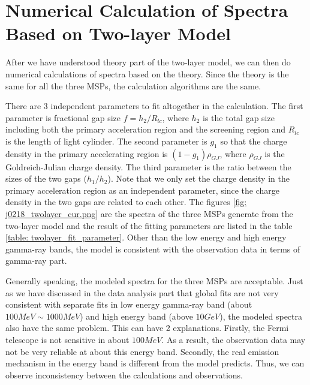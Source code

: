 \documentclass[12pt]{report}
\begin{document}
        \section{Numerical Calculation of Spectra Based on Two-layer Model}
          After we have understood theory part of the two-layer model, we can then do numerical 
          calculations of spectra 
          based on the theory. Since the theory is the same for all the three MSPs, the calculation 
          algorithms are the same. 

          There are 3 independent parameters to fit altogether in the calculation. 
          The first parameter is fractional gap size $f=h_{2}/R_{lc}$, where $h_{2}$ is the 
          total gap size including both the primary acceleration region and the screening region 
          and $R_{lc}$ is the length of light cylinder. The second parameter is $g_{1}$ so that
          the charge density in the primary accelerating region is $\left(1-g_{1}\right) \rho_{GJ}$, 
          where $\rho_{GJ}$ is the Goldreich-Julian charge density. The third parameter is the ratio 
          between the sizes of the two gaps ($h_{1}/h_{2}$). Note that we only set the charge density in the primary acceleration region as an 
          independent parameter, since the charge density in the two gaps are related to each 
          other. The figures \ref{fig: j0218_twolayer_cur.png} are the spectra of the three MSPs generate 
          from the two-layer model and the result of the fitting parameters are listed in the table 
          \ref{table: twolayer_fit_parameter}. Other than the low energy and high energy gamma-ray bands, 
          the model is consistent with the observation data in terms of gamma-ray part. 

          Generally speaking, the modeled spectra for the three MSPs are acceptable. Just as 
          we have discussed in the data analysis part that global fits are not very consistent 
          with separate fits in low energy gamma-ray band (about $100MeV\sim 1000MeV$) and high energy
          band (above $10GeV$), the modeled spectra also have the same problem. 
          This can have 2 explanations. Firstly, the Fermi telescope is not sensitive in about $100 MeV$.
          As a result, the observation data may not be very reliable at about this energy band. Secondly, the  
          real emission mechanism in the energy band is different from the model predicts. Thus, we can observe 
          inconsistency between the calculations and observations.
 
\end{document}
